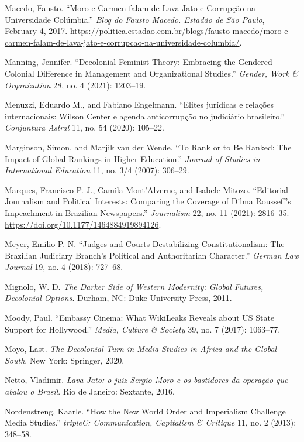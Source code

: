 \documentclass{tufte-handout}
\begin{document}
\begin{hangparas}{.25in}{1}
Macedo, Fausto. ``Moro e Carmen falam de Lava Jato e Corrupção na
Universidade Colúmbia.'' \emph{Blog do Fausto Macedo. Estadão de São
Paulo}, February 4, 2017. \href{https://politica.estadao.com.br/blogs/fausto-macedo/moro-e-carmen-falam-de-lava-jato-e-corrupcao-na-universidade-columbia/}{https://politica.estadao.com.br/blogs/fausto-macedo/moro-e-carmen-falam-de-lava-jato-e-corrupcao-na-universidade-columbia/}.

Manning, Jennifer. ``Decolonial Feminist Theory: Embracing the Gendered
Colonial Difference in Management and Organizational Studies.''
\emph{Gender, Work \& Organization} 28, no. 4 (2021): 1203--19.

Menuzzi, Eduardo M., and Fabiano Engelmann. ``Elites jurídicas e
relações internacionais: Wilson Center e agenda anticorrupção no
judiciário brasileiro.'' \emph{Conjuntura Astral} 11, no. 54 (2020):
105--22.

Marginson, Simon, and Marjik van der Wende. ``To Rank or to Be Ranked:
The Impact of Global Rankings in Higher Education.'' \emph{Journal of
Studies in International Education} 11, no. 3/4 (2007): 306--29.

Marques, Francisco P. J., Camila Mont'Alverne, and Isabele Mitozo.
``Editorial Journalism and Political Interests: Comparing the Coverage
of Dilma Rousseff's Impeachment in Brazilian Newspa­pers.''
\emph{Journalism} 22, no. 11 (2021): 2816--35.
\url{https://doi.org/10.1177/1464884919894126}.

Meyer, Emilio P. N. ``Judges and Courts Destabilizing Constitutionalism:
The Brazil­ian Judiciary Branch's Political and Authoritarian
Character.'' \emph{German Law Journal} 19, no. 4 (2018): 727--68.

Mignolo, W. D. \emph{The Darker Side of Western Modernity: Global
Futures, Decolonial Options}. Durham, NC: Duke University Press, 2011.

Moody, Paul. ``Embassy Cinema: What WikiLeaks Reveals about US State
Support for Hollywood.'' \emph{Media, Culture \& Society} 39, no. 7
(2017): 1063--77.

Moyo, Last. \emph{The Decolonial Turn in Media Studies in Africa and the
Global South}. New York: Springer, 2020.

Netto, Vladimir. \emph{Lava Jato: o juiz Sergio Moro e os bastidores da
operação que abalou o Brasil}. Rio de Janeiro: Sextante, 2016.

Nordenstreng, Kaarle. ``How the New World Order and Imperialism
Challenge Media Studies.'' \emph{tripleC: Communication, Capitalism \&
Critique} 11, no. 2 (2013): 348--58.


\end{hangparas}
\end{document}

